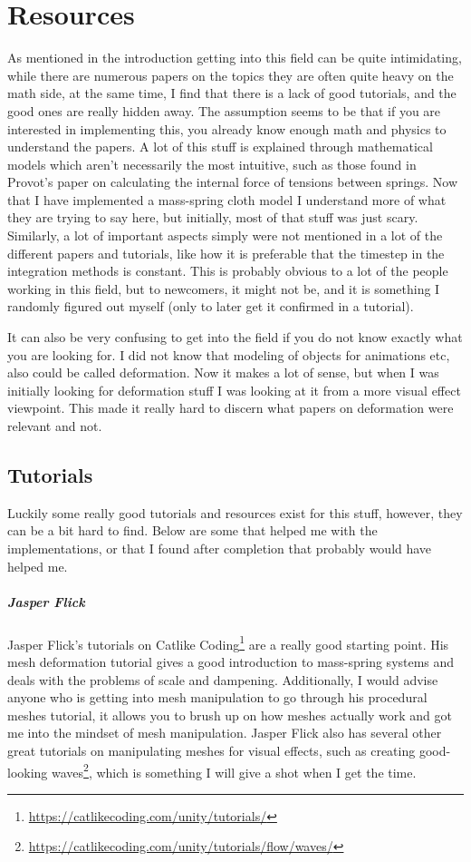 \chapter{Resources}
As mentioned in the introduction getting into this field can be quite intimidating,
while there are numerous papers on the topics they are often quite heavy on the math side,
at the same time, I find that there is a lack of good tutorials, and the good ones are really hidden away.
The assumption seems to be that if you are interested in implementing this, 
you already know enough math and physics to understand the papers.
A lot of this stuff is explained through mathematical models which aren't necessarily the most intuitive,
such as those found in Provot's paper\cite{provot_mass_spring} on calculating the internal force of tensions between springs.
Now that I have implemented a mass-spring cloth model I understand more of what they are trying to say here,
but initially, most of that stuff was just scary.
Similarly, a lot of important aspects simply were not mentioned in a lot of the different papers and tutorials,
like how it is preferable that the timestep in the integration methods is constant.
This is probably obvious to a lot of the people working in this field, but to newcomers, it might not be,
and it is something I randomly figured out myself (only to later get it confirmed in a tutorial).

It can also be very confusing to get into the field if you do not know exactly what you are looking for. 
I did not know that modeling of objects for animations etc, also could be called deformation.
Now it makes a lot of sense, but when I was initially looking for deformation stuff I was looking at it from a more visual effect
viewpoint. This made it really hard to discern what papers on deformation were relevant and not.

\section{Tutorials}
Luckily some really good tutorials and resources exist for this stuff, however, they can be a bit hard to find.
Below are some that helped me with the implementations, or that I found after completion that probably would have helped me.

\paragraph{Jasper Flick}
Jasper Flick's tutorials on Catlike Coding\footnote{\url{https://catlikecoding.com/unity/tutorials/}}
are a really good starting point. His mesh deformation tutorial gives a good introduction to mass-spring systems and deals with the problems of scale and dampening.
Additionally, I would advise anyone who is getting into mesh manipulation to go through his procedural meshes tutorial,
it allows you to brush up on how meshes actually work and got me into the mindset of mesh manipulation.
Jasper Flick also has several other great tutorials on manipulating meshes for visual effects, such as creating good-looking waves\footnote{\url{https://catlikecoding.com/unity/tutorials/flow/waves/}}, which is something I will give a shot when I get the time.

